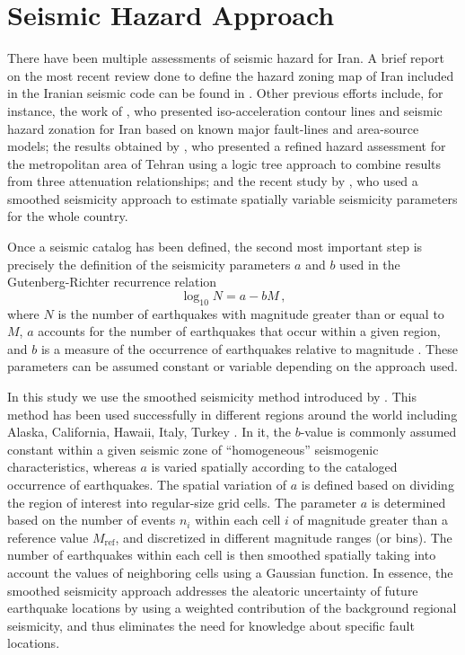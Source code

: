 
\section{Seismic Hazard Approach}

There have been multiple assessments of seismic hazard for Iran. A brief report on the most recent review done to define the hazard zoning map of Iran included in the Iranian seismic code \citep{BHRC2014} can be found in \citet{Moinfar_2012_WCEE}. Other previous efforts include, for instance, the work of \citet{Tavakoli1999}, who presented iso-acceleration contour lines and seismic hazard zonation for Iran based on known major fault-lines and area-source models; the results obtained by \citet{Ghodrati2003}, who presented a refined hazard assessment for the metropolitan area of Tehran using a logic tree approach to combine results from three attenuation relationships; and the recent study by \citet{Khodaverdian_2016_BSSA}, who used a smoothed seismicity approach to estimate spatially variable seismicity parameters for the whole country.

Once a seismic catalog has been defined, the second most important step is precisely the definition of the seismicity parameters $a$ and $b$ used in the Gutenberg-Richter recurrence relation 
% 
\begin{equation}
	\log_{10} N = a - b M \, ,
\end{equation}
% 
\noindent
where $N$ is the number of earthquakes with magnitude greater than or equal to $M$, $a$ accounts for the number of earthquakes that occur within a given region, and $b$ is a measure of the occurrence of earthquakes relative to magnitude \citep{Gutenberg1944}. These parameters can be assumed constant or variable depending on the approach used. 

In this study we use the smoothed seismicity method introduced by \citet{Frankel1995}. This method has been used successfully in different regions around the world including Alaska, California, Hawaii, Italy, Turkey \citep[e.g.,][]{Cao1996, Klein2001, Akinci2004, Kalkan2009, Moschetti2014}. In it, the $b$-value is commonly assumed constant within a given seismic zone of ``homogeneous'' seismogenic characteristics, whereas $a$ is varied spatially according to the cataloged occurrence of earthquakes. The spatial variation of $a$ is defined based on dividing the region of interest into regular-size grid cells. The parameter $a$ is determined based on the number of events $n_i$ within each cell $i$ of magnitude greater than a reference value $M_{\mathrm{ref}}$, and discretized in different magnitude ranges (or bins). The number of earthquakes within each cell is then smoothed spatially taking into account the values of neighboring cells using a Gaussian function. In essence, the smoothed seismicity approach addresses the aleatoric uncertainty of future earthquake locations by using a weighted contribution of the background regional seismicity, and thus eliminates the need for knowledge about specific fault locations.

